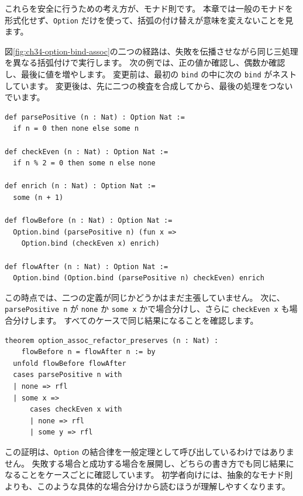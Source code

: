 これらを安全に行うための考え方が、モナド則です。
本章では一般のモナドを形式化せず、\texttt{Option} だけを使って、括弧の付け替えが意味を変えないことを見ます。


図\ref{fig:ch34-option-bind-assoc}の二つの経路は、失敗を伝播させながら同じ三処理を異なる括弧付けで実行します。
次の例では、正の値か確認し、偶数か確認し、最後に値を増やします。
変更前は、最初の \texttt{bind} の中に次の \texttt{bind} がネストしています。
変更後は、先に二つの検査を合成してから、最後の処理をつないでいます。

\begin{listing}[htbp]
\begin{verbatim}
def parsePositive (n : Nat) : Option Nat :=
  if n = 0 then none else some n

def checkEven (n : Nat) : Option Nat :=
  if n % 2 = 0 then some n else none

def enrich (n : Nat) : Option Nat :=
  some (n + 1)

def flowBefore (n : Nat) : Option Nat :=
  Option.bind (parsePositive n) (fun x =>
    Option.bind (checkEven x) enrich)

def flowAfter (n : Nat) : Option Nat :=
  Option.bind (Option.bind (parsePositive n) checkEven) enrich
\end{verbatim}
\caption{\texttt{flowBefore}・\texttt{flowAfter}}
\label{lst:ch34-option-assoc}
\end{listing}

この時点では、二つの定義が同じかどうかはまだ主張していません。
次に、\texttt{parsePositive n} が \texttt{none} か \texttt{some x} かで場合分けし、さらに \texttt{checkEven x} も場合分けします。
すべてのケースで同じ結果になることを確認します。

\begin{listing}[htbp]
\begin{verbatim}
theorem option_assoc_refactor_preserves (n : Nat) :
    flowBefore n = flowAfter n := by
  unfold flowBefore flowAfter
  cases parsePositive n with
  | none => rfl
  | some x =>
      cases checkEven x with
      | none => rfl
      | some y => rfl
\end{verbatim}
\caption{\texttt{option\_assoc\_refactor\_preserves}}
\label{lst:ch34-option-assoc-proof}
\end{listing}

この証明は、\texttt{Option} の結合律を一般定理として呼び出しているわけではありません。
失敗する場合と成功する場合を展開し、どちらの書き方でも同じ結果になることをケースごとに確認しています。
初学者向けには、抽象的なモナド則よりも、このような具体的な場合分けから読むほうが理解しやすくなります。

